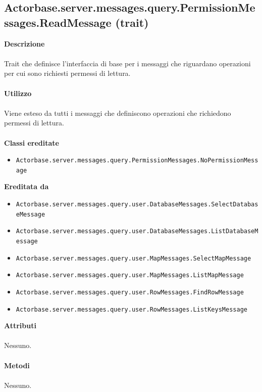 \documentclass[a4paper]{article}
\begin{document}
\subsection{Actorbase.server.messages.query.PermissionMessages.ReadMessage (trait)}
		\textbf{Descrizione}
			\\ \\
			Trait che definisce l'interfaccia di base per i messaggi che riguardano operazioni per cui sono richiesti permessi di lettura.
			\\ \\
		\textbf{Utilizzo}
			\\ \\
			Viene esteso da tutti i messaggi che definiscono operazioni che richiedono permessi di lettura.
			\\ \\
		\textbf{Classi ereditate}
			\begin{itemize}
				\item \texttt{Actorbase.server.messages.query.PermissionMessages.NoPermissionMessage}
			\end{itemize}
		\textbf{Ereditata da}
			\begin{itemize}
				\item \texttt{Actorbase.server.messages.query.user.DatabaseMessages.SelectDatabaseMessage}
				\item \texttt{Actorbase.server.messages.query.user.DatabaseMessages.ListDatabaseMessage}
				\item \texttt{Actorbase.server.messages.query.user.MapMessages.SelectMapMessage}
				\item \texttt{Actorbase.server.messages.query.user.MapMessages.ListMapMessage}
				\item \texttt{Actorbase.server.messages.query.user.RowMessages.FindRowMessage}
				\item \texttt{Actorbase.server.messages.query.user.RowMessages.ListKeysMessage}
			\end{itemize}
		\textbf{Attributi}
			\\ \\
			Nessuno.
			\\ \\
		\textbf{Metodi}
			\\ \\
			Nessuno.
			
\end{document}
